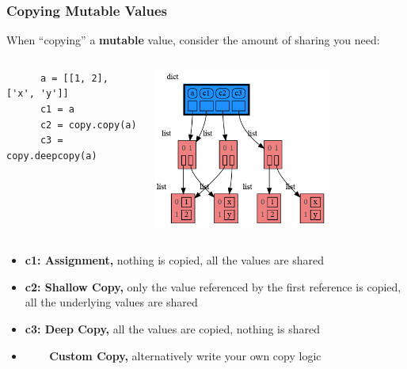 \documentclass[10pt, colorlinks=true, urlcolor=blue]{beamer}
\begin{document}
\begin{frame}[fragile]
  \frametitle{Copying Mutable Values}
  When ``copying'' a \textbf{mutable} value, consider the amount of sharing you need:
  \vspace{-1em}
\begin{columns}
  \begin{verbatim}
      a = [[1, 2], ['x', 'y']]
      c1 = a
      c2 = copy.copy(a)
      c3 = copy.deepcopy(a)
    \end{verbatim}
    \begin{center}\includegraphics[width=0.7\textwidth]{figures/copy.png}\end{center}
\end{columns}
    \begin{itemize}
        \item \textbf{c1: Assignment,} nothing is copied, all the values are shared
        \item \textbf{c2: Shallow Copy,} only the value referenced by the first reference is copied, all the underlying values are shared
        \item \textbf{c3: Deep Copy,} all the values are copied, nothing is shared
        \item \ \ \, \,\, \textbf{Custom Copy,} alternatively write your own copy logic
    \end{itemize}
\end{frame}
\end{document}
